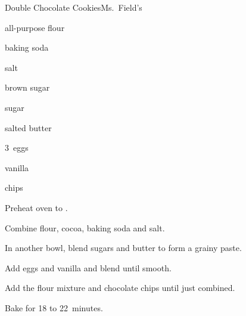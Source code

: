 \begin{recipe}{Double Chocolate Cookies}{Ms.~Field's}{}

\begin{ingredients}
\item \C{2\quarter} all-purpose flour
\item \C{\half} 
\item \tp{\half} baking soda
\item \tp{\quarter} salt
\item {} brown sugar
\item \C{\threequarter} sugar
\item {} salted butter
\item 3~eggs
\item {} vanilla
\item {}  chips
\end{ingredients}

\begin{directions}
\item Preheat oven to .
\item Combine flour, cocoa, baking soda and salt.
\item In another bowl, blend sugars and butter to form a grainy paste.
\item Add eggs and vanilla and blend until smooth.
\item Add the flour mixture and chocolate chips until just combined.
\item Bake for 18 to 22~minutes.
\end{directions}
\end{recipe}
